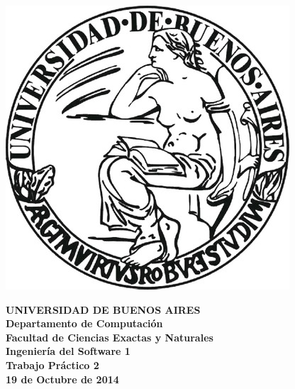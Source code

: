 \documentclass[a4paper]{article}
\begin{document}

\def\Materia{Ingenier\'ia del Software 1}
\def\Titulo{Trabajo Pr\'actico 2}
\def\Fecha{19 de Octubre de 2014}


\thispagestyle{empty}

\begin{center}
	\includegraphics[scale = 0.25]{logo_uba.jpg}
\end{center}

\vspace{5mm}

\begin{center}
	{\textbf{\large UNIVERSIDAD DE BUENOS AIRES}}\\[1.5em]
	{\textbf{\large Departamento de Computaci\'{o}n}}\\[1.5em]
    {\textbf{\large Facultad de Ciencias Exactas y Naturales}}\\
    \vspace{35mm}
    {\LARGE\textbf{\Materia}}\\[1em]
    \vspace{15mm}
    {\Large \textbf{\Titulo}}\\[1em]
    \vspace{15mm}
    {\textbf{\Large \Fecha}}\\
    \vspace{15mm}
    \textbf{\tablaints}
\end{center}
\end{document}
